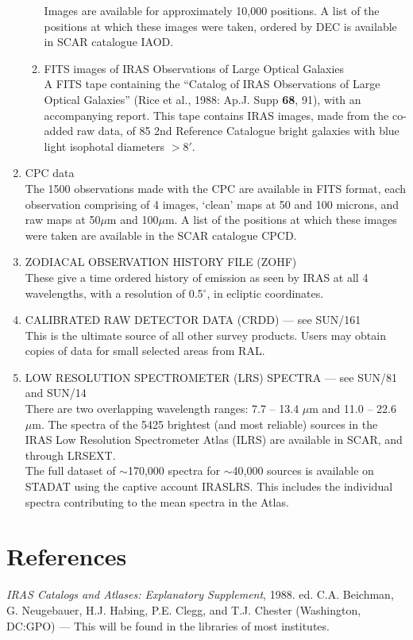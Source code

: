 \begin{enumerate}
\begin{enumerate}
        Images are available for approximately 10,000 positions.
	A list of the positions at which these images were taken, ordered by 
        DEC is available in SCAR catalogue IAOD.
	\item FITS images of IRAS Observations of Large Optical Galaxies\\
         A FITS tape containing the ``Catalog of IRAS Observations of Large 
         Optical Galaxies'' (Rice et al., 1988: Ap.J. Supp {\bf 68}, 91),
         with an accompanying report. This tape contains IRAS images, made
         from the co-added raw data, of 85 2nd Reference Catalogue bright
         galaxies with blue light isophotal diameters $>$8$'$. 

	\end{enumerate}
\item CPC data \\
         The 1500 observations made with the CPC are available in FITS format,
         each observation comprising of 4 images, `clean' maps at 50 and 100
         microns, and raw maps at 50$\mu$m and 100$\mu$m.
         A list of the positions at which these images were taken are available
         in the SCAR catalogue CPCD.
\item ZODIACAL OBSERVATION HISTORY FILE (ZOHF) \\
         These give a time ordered history of emission as seen by IRAS at all
         4 wavelengths,
         with a resolution of 0.5$^{\circ}$, in ecliptic coordinates.
\item CALIBRATED RAW DETECTOR DATA (CRDD) --- see SUN/161\\
	This is the ultimate source of all other survey products.
	Users may obtain copies of data for small selected areas from RAL. 
\item LOW RESOLUTION SPECTROMETER (LRS) SPECTRA --- see SUN/81 and SUN/14\\
There are two overlapping wavelength ranges: 7.7 -- 13.4 $\mu$m and 
11.0 -- 22.6 $\mu$m. 
The spectra of the 5425 brightest (and most reliable) sources in the IRAS Low 
Resolution Spectrometer Atlas (ILRS) are available in SCAR, and through 
LRSEXT.\\
The full dataset of $\sim$170,000 spectra for $\sim$40,000 sources is 
available on STADAT using the captive account IRASLRS. 
This includes the individual spectra contributing to the mean spectra in 
the Atlas.
\end{enumerate}

\section{References}
{\em IRAS Catalogs and Atlases: Explanatory Supplement}, 1988. ed. C.A. 
Beichman, G. Neugebauer, H.J. Habing, P.E. Clegg, and T.J. Chester (Washington,
DC:GPO) --- This will be found in the libraries of most institutes.

